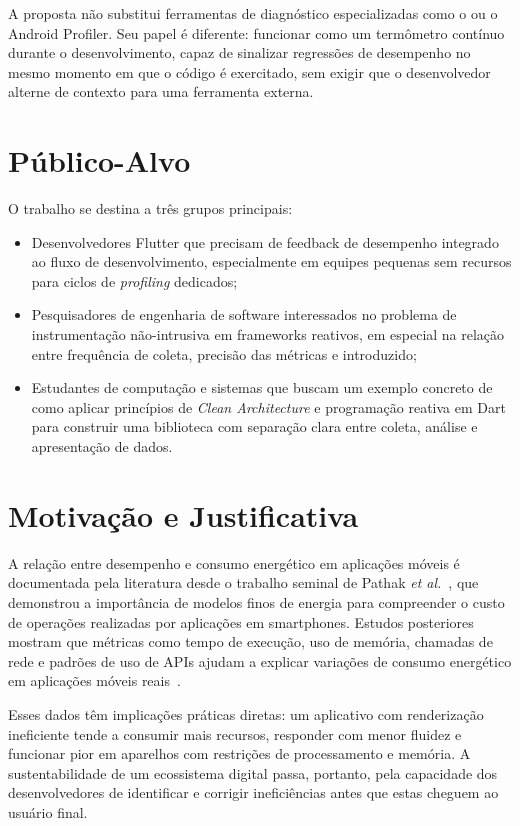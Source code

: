A proposta não substitui ferramentas de diagnóstico especializadas como o \devtools{} ou o Android Profiler. Seu papel é diferente: funcionar como um termômetro contínuo durante o desenvolvimento, capaz de sinalizar regressões de desempenho no mesmo momento em que o código é exercitado, sem exigir que o desenvolvedor alterne de contexto para uma ferramenta externa.

\section{Público-Alvo}


O trabalho se destina a três grupos principais:
\begin{itemize}
  \item Desenvolvedores Flutter que precisam de feedback de desempenho integrado ao fluxo de desenvolvimento, especialmente em equipes pequenas sem recursos para ciclos de \textit{profiling} dedicados;
  \item Pesquisadores de engenharia de software interessados no problema de instrumentação não-intrusiva em frameworks reativos, em especial na relação entre frequência de coleta, precisão das métricas e \overhead{} introduzido;
  \item Estudantes de computação e sistemas que buscam um exemplo concreto de como aplicar princípios de \textit{Clean Architecture} e programação reativa em Dart para construir uma biblioteca com separação clara entre coleta, análise e apresentação de dados.
\end{itemize}

\section{Motivação e Justificativa}


A relação entre desempenho e consumo energético em aplicações móveis é documentada pela literatura desde o trabalho seminal de Pathak \textit{et al.}~\cite{pathak2012energy}, que demonstrou a importância de modelos finos de energia para compreender o custo de operações realizadas por aplicações em smartphones. Estudos posteriores mostram que métricas como tempo de execução, uso de memória, chamadas de rede e padrões de uso de APIs ajudam a explicar variações de consumo energético em aplicações móveis reais~\cite{li2014empirical,rua2024largescale,bangash2023apienergy}.

Esses dados têm implicações práticas diretas: um aplicativo com renderização ineficiente tende a consumir mais recursos, responder com menor fluidez e funcionar pior em aparelhos com restrições de processamento e memória. A sustentabilidade de um ecossistema digital passa, portanto, pela capacidade dos desenvolvedores de identificar e corrigir ineficiências antes que estas cheguem ao usuário final.


